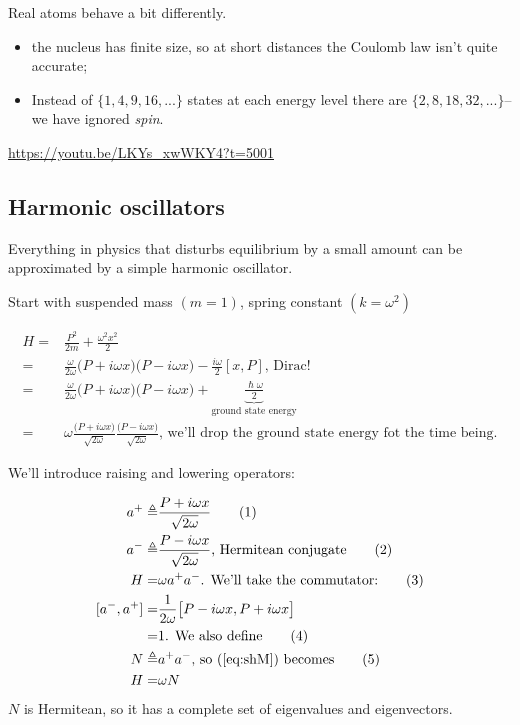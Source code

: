 \documentclass[]{article}
\newcommand\numberthis{\addtocounter{equation}{1}\tag{\theequation}}
\begin{document}
Real atoms behave a bit differently.
\begin{itemize}
	\item the nucleus has finite size, so at short distances the Coulomb law isn't quite accurate;
	\item Instead of  $\{1,4,9,16,...\}$ states at each energy level there are  $\{2,8,18,32,...\}$--we have ignored \emph{spin}.
\end{itemize}

\url{https://youtu.be/LKYs_xwWKY4?t=5001}

\subsection{Harmonic oscillators}

Everything in physics that disturbs equilibrium by a small amount can be approximated by a simple harmonic oscillator. 

Start with suspended mass $(m=1)$, spring constant $(k=\omega^2)$

\begin{align*}
	H =& \frac{P^2}{2m} + \frac{\omega^2 x^2}{2}\\
	=& \frac{\omega}{2 \omega}\big(P + i \omega x \big)\big(P - i \omega x \big) - \frac{i \omega}{2} [x,P] \text{, Dirac!}\\
	=& \frac{\omega}{2 \omega}\big(P + i \omega x \big)\big(P - i \omega x \big) + \underbrace{\frac{\hslash \omega}{2}}_\text{ground state energy}\\
	=&\omega \frac{\big(P + i \omega x \big)}{\sqrt{2 \omega}}\frac{\big(P - i \omega x \big)}{\sqrt{2 \omega}}\text{, we'll drop the ground state energy fot the time being.}
\end{align*}

We'll introduce raising and lowering operators:

\begin{align*}
	a^+ \triangleq & \frac{P + i \omega x } {\sqrt{2 \omega}} \numberthis \label{eq:creation:operator}\\
	a^- \triangleq & \frac{P - i \omega x } {\sqrt{2 \omega}}\text{, Hermitean conjugate} \numberthis \label{eq:annihilation:operator}\\
	H =& \omega a^+ a^-\text{. We'll take the commutator:}\numberthis \label{eq:shM}\\
	[a^-,a^+] =& \frac{1}{2\omega}\big[P - i \omega x,P + i \omega x\big]\\
	=& 1\text{. We also define} \numberthis \label{eq:a:comm}\\
	N \triangleq& a^+a^-\text{, so (\ref{eq:shM}) becomes} \numberthis \label{eq:number:operator}\\
	H =& \omega N
\end{align*}
$N$ is Hermitean, so it has a complete set of eigenvalues and eigenvectors.
\end{document}
